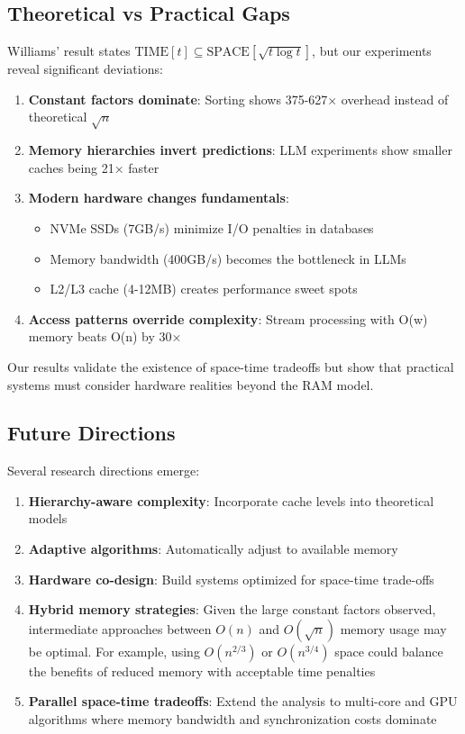 \documentclass[11pt]{article}
\theoremstyle{definition}
\begin{document}
\subsection{Theoretical vs Practical Gaps}

Williams' result states $\text{TIME}[t] \subseteq \text{SPACE}[\sqrt{t \log t}]$, but our experiments reveal significant deviations:

\begin{enumerate}
\item \textbf{Constant factors dominate}: Sorting shows 375-627× overhead instead of theoretical $\sqrt{n}$
\item \textbf{Memory hierarchies invert predictions}: LLM experiments show smaller caches being 21× faster
\item \textbf{Modern hardware changes fundamentals}: 
   \begin{itemize}
   \item NVMe SSDs (7GB/s) minimize I/O penalties in databases
   \item Memory bandwidth (400GB/s) becomes the bottleneck in LLMs
   \item L2/L3 cache (4-12MB) creates performance sweet spots
   \end{itemize}
\item \textbf{Access patterns override complexity}: Stream processing with O(w) memory beats O(n) by 30×
\end{enumerate}

Our results validate the existence of space-time tradeoffs but show that practical systems must consider hardware realities beyond the RAM model.

\subsection{Future Directions}

Several research directions emerge:

\begin{enumerate}
\item \textbf{Hierarchy-aware complexity}: Incorporate cache levels into theoretical models
\item \textbf{Adaptive algorithms}: Automatically adjust to available memory
\item \textbf{Hardware co-design}: Build systems optimized for space-time trade-offs
\item \textbf{Hybrid memory strategies}: Given the large constant factors observed, intermediate approaches between $O(n)$ and $O(\sqrt{n})$ memory usage may be optimal. For example, using $O(n^{2/3})$ or $O(n^{3/4})$ space could balance the benefits of reduced memory with acceptable time penalties
\item \textbf{Parallel space-time tradeoffs}: Extend the analysis to multi-core and GPU algorithms where memory bandwidth and synchronization costs dominate
\end{enumerate}
\end{document}
